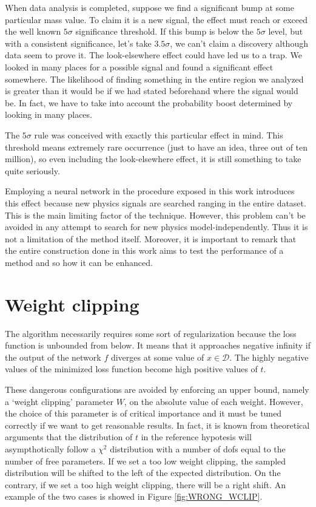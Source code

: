 When data analysis is completed, suppose we find a significant bump at some particular mass value. To claim it is a new signal, the effect must reach or exceed the well known $5\sigma$ significance threshold. If this bump is below the $5\sigma$ level, but with a consistent significance, let's take $3.5\sigma$, we can't claim a discovery although data seem to prove it. The look-elsewhere effect could have led us to a trap. We looked in many places for a possible signal and found a significant effect somewhere. The likelihood of finding something in the entire region we analyzed is greater than it would be if we had stated beforehand where the signal would be. In fact, we have to take into account the probability boost determined by looking in many places.

The $5\sigma$ rule was conceived with exactly this particular effect in mind. This threshold means extremely rare occurrence (just to have an idea, three out of ten million), so even including the look-elsewhere effect, it is still something to take quite seriously.

Employing a neural network in the procedure exposed in this work introduces this effect because new physics signals are searched ranging in the entire dataset. This is the main limiting factor of the technique. However, this problem can't be avoided in any attempt to search for new physics model-independently. Thus it is not a limitation of the method itself. Moreover, it is important to remark that the entire construction done in this work aims to test the performance of a method and so how it can be enhanced.





\section{Weight clipping}
The algorithm necessarily requires some sort of regularization because the loss function is unbounded from below. It means that it approaches negative infinity if the output of the network $f$ diverges at some value of $x \in \mathcal{D}$. The highly negative values of the minimized loss function become high positive values of $t$.

These dangerous configurations are avoided by enforcing an upper bound, namely a `weight clipping' parameter $W$, on the absolute value of each weight. However, the choice of this parameter is of critical importance and it must be tuned correctly if we want to get reasonable results. In fact, it is known from theoretical arguments that the distribution of $t$ in the reference hypotesis will asympthotically follow a $\chi^2$ distribution with a number of dofs equal to the number of free parameters. If we set a too low weight clipping, the sampled distribution will be shifted to the left of the expected distribution. On the contrary, if we set a too high weight clipping, there will be a right shift. An example of the two cases is showed in Figure \ref{fig:WRONG_WCLIP}\footnotemark.


